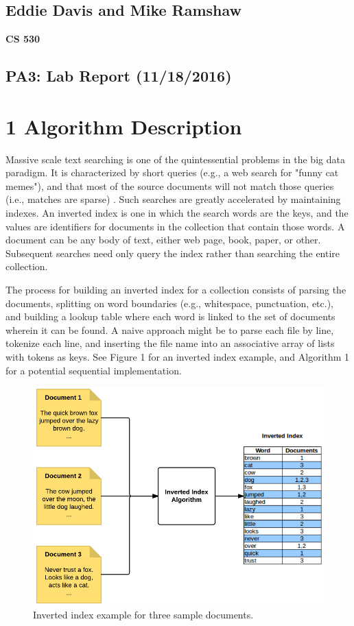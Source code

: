 \documentclass{bsu-ms}
\begin{document}
\subsection*{Eddie Davis and Mike Ramshaw}
\textbf{CS 530}\\
\subsection*{PA3: Lab Report (11/18/2016)}

\section*{1 Algorithm Description}

Massive scale text searching is one of the quintessential problems in the big data paradigm. It is characterized by short queries (e.g., a web search for "funny cat memes"), and that most of the source documents will not match those queries (i.e., matches are sparse) . Such searches are greatly accelerated by maintaining indexes. An inverted index is one in which the search words are the keys, and the values are identifiers for documents in the collection that contain those words. A document can be any body of text, either web page, book, paper, or other. Subsequent searches need only query the index rather than searching the entire collection.

The process for building an inverted index for a collection consists of parsing the documents, splitting on word boundaries (e.g., whitespace, punctuation, etc.), and building a lookup table where each word is linked to the set of documents wherein it can be found. A naive approach might be to parse each file by line, tokenize each line, and inserting the file name into an associative array of lists with tokens as keys. See Figure 1 for an inverted index example, and Algorithm 1 for a potential sequential implementation.

\begin{figure}[ht]
	\begin{center}
		\includegraphics[scale=.6,keepaspectratio]{invertedindex.png}
	\end{center}
	\caption{Inverted index example for three sample documents.}
	\label{fig:fig1}
\end{figure}
\end{document}
